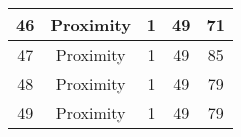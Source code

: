 \documentclass[results.tex]{subfiles}
\begin{document}
\begin{center}
\begin{tabular}{| c || c | c | c | c |}
            \hline
            46                      & Proximity                    & 1                      & 49                      & 71                   \\
            \hline
            47                      & Proximity                    & 1                      & 49                      & 85                   \\
            \hline
            48                      & Proximity                    & 1                      & 49                      & 79                   \\
            \hline
            49                      & Proximity                    & 1                      & 49                      & 79                   \\
            \hline
        \end{tabular}
    \end{center}
\end{document}
